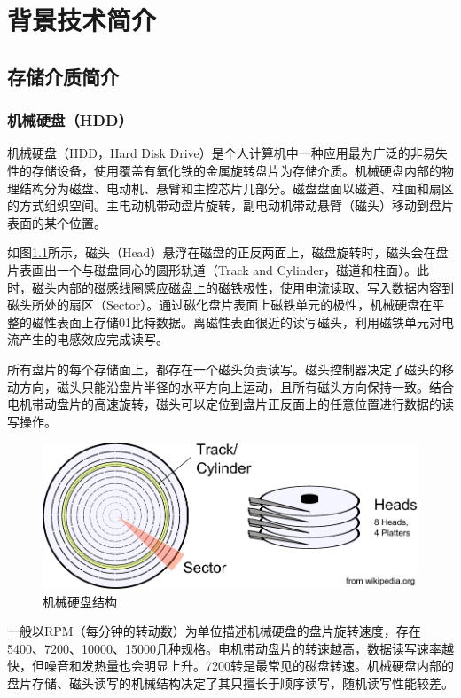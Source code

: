 
\chapter{背景技术简介}
\label{cha:related_work}

\section{存储介质简介}

\subsection{机械硬盘（HDD）}
机械硬盘\cite{hdd2009}（HDD，Hard Disk Drive）是个人计算机中一种应用最为广泛的非易失性的存储设备，使用覆盖有氧化铁的金属旋转盘片为存储介质。机械硬盘内部的物理结构分为磁盘、电动机、悬臂和主控芯片几部分。磁盘盘面以磁道、柱面和扇区的方式组织空间。主电动机带动盘片旋转，副电动机带动悬臂（磁头）移动到盘片表面的某个位置。

如图\ref{fig:hdd-struct}所示，磁头（Head）悬浮在磁盘的正反两面上，磁盘旋转时，磁头会在盘片表画出一个与磁盘同心的圆形轨道（Track and Cylinder，磁道和柱面）。此时，磁头内部的磁感线圈感应磁盘上的磁铁极性，使用电流读取、写入数据内容到磁头所处的扇区（Sector）。通过磁化盘片表面上磁铁单元的极性，机械硬盘在平整的磁性表面上存储01比特数据。离磁性表面很近的读写磁头，利用磁铁单元对电流产生的电感效应完成读写。

所有盘片的每个存储面上，都存在一个磁头负责读写。磁头控制器决定了磁头的移动方向，磁头只能沿盘片半径的水平方向上运动，且所有磁头方向保持一致。结合电机带动盘片的高速旋转，磁头可以定位到盘片正反面上的任意位置进行数据的读写操作。

\begin{figure}[H]
\centering
\includegraphics[width=0.6\linewidth]{./graph/hdd-struct}
\caption{机械硬盘结构}
\label{fig:hdd-struct}
\end{figure}

一般以RPM（每分钟的转动数）为单位描述机械硬盘的盘片旋转速度，存在5400、7200、10000、15000几种规格。电机带动盘片的转速越高，数据读写速率越快，但噪音和发热量也会明显上升。7200转是最常见的磁盘转速。机械硬盘内部的盘片存储、磁头读写的机械结构决定了其只擅长于顺序读写，随机读写性能较差。


